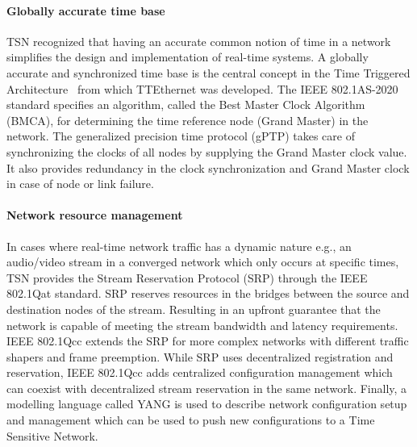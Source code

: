 \paragraph{Globally accurate time base}
TSN recognized that having an accurate common notion of time in a network simplifies the design and implementation of real-time systems. A globally accurate and synchronized time base is the central concept in the Time Triggered Architecture~\cite{kopetz2003time} from which TTEthernet was developed. The IEEE 802.1AS-2020 standard specifies an algorithm, called the Best Master Clock Algorithm (BMCA), for determining the time reference node (Grand Master) in the network. The generalized precision time protocol (gPTP) takes care of synchronizing the clocks of all nodes by supplying the Grand Master clock value. It also provides redundancy in the clock synchronization and Grand Master clock in case of node or link failure.

\paragraph{Network resource management} In cases where real-time network traffic has a dynamic nature e.g., an audio/video stream in a converged network which only occurs at specific times, TSN provides the Stream Reservation Protocol (SRP) through the IEEE 802.1Qat standard. SRP reserves resources in the bridges between the source and destination nodes of the stream. Resulting in an upfront guarantee that the network is capable of meeting the stream bandwidth and latency requirements. IEEE 802.1Qcc extends the SRP for more complex networks with different traffic shapers and frame preemption. While SRP uses decentralized registration and reservation, IEEE 802.1Qcc adds centralized configuration management which can coexist with decentralized stream reservation in the same network. Finally, a modelling language called YANG is used to describe network configuration setup and management which can be used to push new configurations to a Time Sensitive Network. 

